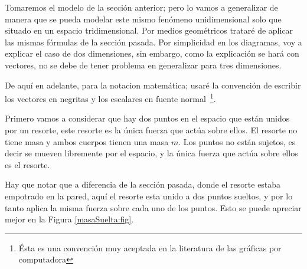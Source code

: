 Tomaremos el modelo de la sección anterior; pero lo vamos a generalizar de manera que se pueda modelar este mismo fenómeno unidimensional solo que situado en un espacio tridimensional.
Por medios geométricos trataré de aplicar las mismas fórmulas de la sección pasada.
Por simplicidad en los diagramas, voy a explicar el caso de dos dimensiones, sin embargo, como la explicación se hará con vectores, no se debe de tener problema en generalizar para tres dimensiones.

De aquí en adelante, para la notacion matemática; usaré la convención de escribir los vectores en negritas y los escalares en fuente normal~\footnote{Ésta es una convención muy aceptada en la literatura de las gráficas por computadora}.

Primero vamos a considerar que hay dos puntos en el espacio que están unidos por un resorte, este resorte es la única fuerza que actúa sobre ellos.
El resorte no tiene masa y ambos cuerpos tienen una masa $m$.
Los puntos no están sujetos, es decir se mueven libremente por el espacio, y la única fuerza que actúa sobre ellos es el resorte.

Hay que notar que a diferencia de la sección pasada, donde el resorte estaba empotrado en la pared, aquí el resorte esta unido a dos puntos sueltos, y por lo tanto aplica la misma fuerza sobre cada uno de los puntos.
Esto se puede apreciar mejor en la Figura \ref{masaSuelta:fig}.


